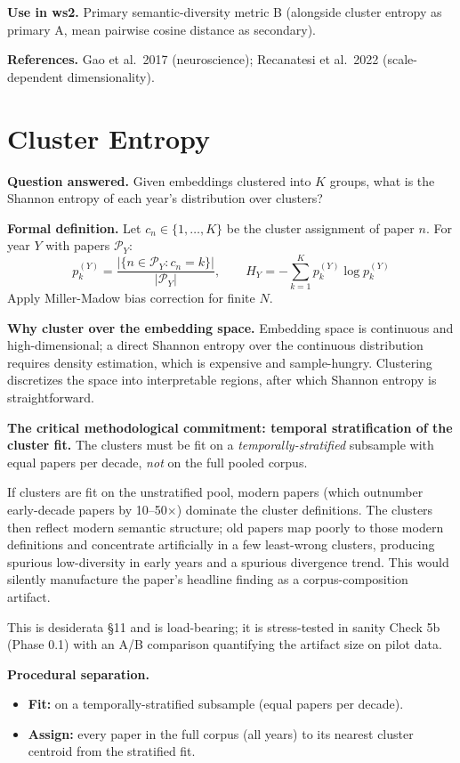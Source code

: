 \documentclass[11pt]{article}
\begin{document}
\textbf{Use in ws2.} Primary semantic-diversity metric B (alongside
cluster entropy as primary A, mean pairwise cosine distance as
secondary).

\textbf{References.} Gao et al.~2017 (neuroscience); Recanatesi et
al.~2022 (scale-dependent dimensionality).

\section{Cluster Entropy}
\label{sec:cluster-entropy}

\textbf{Question answered.} Given embeddings clustered into $K$
groups, what is the Shannon entropy of each year's distribution over
clusters?

\textbf{Formal definition.} Let $c_n \in \{1, \ldots, K\}$ be the
cluster assignment of paper $n$. For year $Y$ with papers
$\mathcal{P}_Y$:
\[
  p_k^{(Y)} = \frac{|\{n \in \mathcal{P}_Y : c_n = k\}|}{|\mathcal{P}_Y|},
  \qquad
  H_Y = -\sum_{k=1}^{K} p_k^{(Y)} \log p_k^{(Y)}
\]
Apply Miller-Madow bias correction for finite $N$.

\textbf{Why cluster over the embedding space.} Embedding space is
continuous and high-dimensional; a direct Shannon entropy over the
continuous distribution requires density estimation, which is
expensive and sample-hungry. Clustering discretizes the space into
interpretable regions, after which Shannon entropy is straightforward.

\textbf{The critical methodological commitment: temporal stratification
of the cluster fit.} The clusters must be fit on a
\textit{temporally-stratified} subsample with equal papers per decade,
\textit{not} on the full pooled corpus.

If clusters are fit on the unstratified pool, modern papers (which
outnumber early-decade papers by 10--50$\times$) dominate the cluster
definitions. The clusters then reflect modern semantic structure; old
papers map poorly to those modern definitions and concentrate
artificially in a few least-wrong clusters, producing spurious
low-diversity in early years and a spurious divergence trend. This
would silently manufacture the paper's headline finding as a
corpus-composition artifact.

This is desiderata §11 and is load-bearing; it is stress-tested in
sanity Check 5b (Phase 0.1) with an A/B comparison quantifying the
artifact size on pilot data.

\textbf{Procedural separation.}
\begin{itemize}[nosep]
  \item \textbf{Fit:} on a temporally-stratified subsample (equal
    papers per decade).
  \item \textbf{Assign:} every paper in the full corpus (all years) to
    its nearest cluster centroid from the stratified fit.
\end{itemize}
\end{document}
